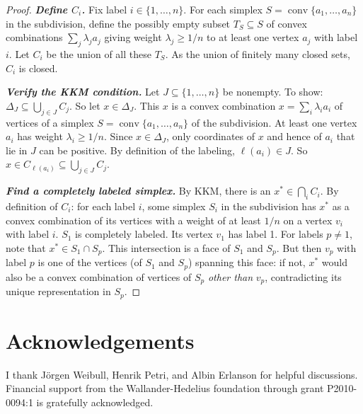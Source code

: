 \documentclass[english, 11pt]{article}
\newcommand{\conv}{\mathop{\mathrm{conv}}}
\newcommand{\bem}[1]{\emph{\textbf{#1}\/}}
\theoremstyle{plain} %
\begin{document}
\begin{proof}
\noindent \bem{Define $C_i$.} Fix label $i \in \{1, \ldots, n\}$. For each simplex $S = \conv \{a_1, \ldots, a_n\}$ in the subdivision, define the possibly empty subset $T_S \subseteq S$ of convex combinations $\sum_j \lambda_j a_j$ giving weight $\lambda_j \geq 1/n$ to at least one vertex $a_j$ with label $i$. Let $C_i$ be the union of all these $T_S$. As the union of finitely many closed sets, $C_i$ is closed.

\noindent \bem{Verify the KKM condition.} Let $J \subseteq \{1, \ldots, n\}$ be nonempty. To show: $\Delta_J \subseteq \bigcup_{j \in J} C_j$. So let $x \in \Delta_J$. This $x$ is a convex combination $x = \sum_i \lambda_i a_i$ of vertices of a simplex $S = \conv \{a_1, \ldots, a_n\}$ of the subdivision. At least one vertex $a_i$ has weight $\lambda_i \geq 1/n$. Since $x \in \Delta_J$, only coordinates of $x$ and hence of $a_i$ that lie in $J$ can be positive. By definition of the labeling, $\ell(a_i) \in J$. So $x \in C_{\ell(a_i)} \subseteq \bigcup_{j \in J} C_j$.

\noindent \bem{Find a completely labeled simplex.} By KKM, there is an $x^* \in \bigcap_i C_i$. By definition of $C_i$: for each label $i$, some simplex $S_i$ in the subdivision has $x^*$ as a convex combination of its vertices with a weight of at least $1/n$ on a vertex $v_i$ with label $i$. $S_1$ is completely labeled. Its vertex $v_1$ has label 1.  For labels $p \neq 1$, note that $x^* \in S_1 \cap S_p$. This intersection is a face of $S_1$ and $S_p$. But then $v_p$ with label $p$ is one of the vertices (of $S_1$ and $S_p$) spanning this face: if not, $x^*$ would also be a convex combination of vertices of $S_p$ \emph{other than\/} $v_p$, contradicting its unique representation in $S_p$.
\end{proof}

\section*{Acknowledgements}

I thank J\"{o}rgen Weibull, Henrik Petri, and Albin Erlanson for helpful discussions. Financial support from the Wallander-Hedelius foundation through grant P2010-0094:1 is gratefully acknowledged.



\end{document}
